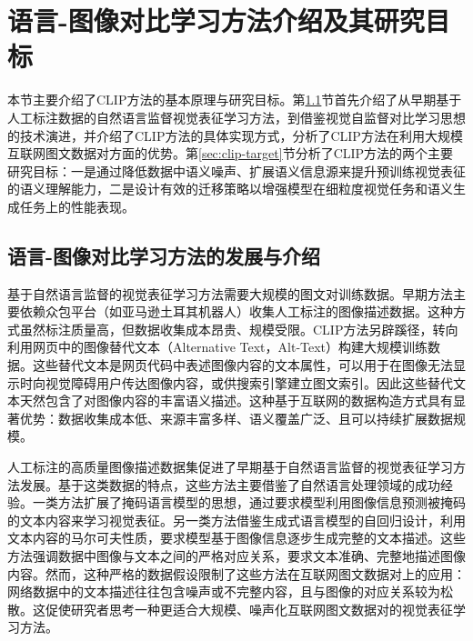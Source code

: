 \section{语言-图像对比学习方法介绍及其研究目标}
本节主要介绍了CLIP方法的基本原理与研究目标。第\ref{sec:clip-introduce}节首先介绍了从早期基于人工标注数据的自然语言监督视觉表征学习方法，到借鉴视觉自监督对比学习思想的技术演进，并介绍了CLIP方法的具体实现方式，分析了CLIP方法在利用大规模互联网图文数据对方面的优势。第\ref{sec:clip-target}节分析了CLIP方法的两个主要研究目标：一是通过降低数据中语义噪声、扩展语义信息源来提升预训练视觉表征的语义理解能力，二是设计有效的迁移策略以增强模型在细粒度视觉任务和语义生成任务上的性能表现。

\subsection{语言-图像对比学习方法的发展与介绍}
\label{sec:clip-introduce}
基于自然语言监督的视觉表征学习方法需要大规模的图文对训练数据。早期方法主要依赖众包平台（如亚马逊土耳其机器人\cite{AMT}）收集人工标注的图像描述数据\cite{young2014flickr, chen2015microsoft}。这种方式虽然标注质量高，但数据收集成本昂贵、规模受限。CLIP方法另辟蹊径，转向利用网页中的图像替代文本（Alternative Text，Alt-Text）构建大规模训练数据\cite{YFCC100M, sharma-etal-2018-conceptual, changpinyo2021conceptual}。这些替代文本是网页代码中表述图像内容的文本属性，可以用于在图像无法显示时向视觉障碍用户传达图像内容，或供搜索引擎建立图文索引。因此这些替代文本天然包含了对图像内容的丰富语义描述。这种基于互联网的数据构造方式具有显著优势：数据收集成本低、来源丰富多样、语义覆盖广泛、且可以持续扩展数据规模。

人工标注的高质量图像描述数据集\cite{young2014flickr, chen2015microsoft}促进了早期基于自然语言监督的视觉表征学习方法发展。基于这类数据的特点，这些方法主要借鉴了自然语言处理领域的成功经验。一类方法扩展了掩码语言模型\cite{BERT}的思想，通过要求模型利用图像信息预测被掩码的文本内容来学习视觉表征\cite{sariyildiz2020learning}。另一类方法借鉴生成式语言模型\cite{gpt2}的自回归设计，利用文本内容的马尔可夫性质，要求模型基于图像信息逐步生成完整的文本描述\cite{desai2021virtex}。这些方法强调数据中图像与文本之间的严格对应关系，要求文本准确、完整地描述图像内容。然而，这种严格的数据假设限制了这些方法在互联网图文数据对上的应用：网络数据中的文本描述往往包含噪声或不完整内容，且与图像的对应关系较为松散。这促使研究者思考一种更适合大规模、噪声化互联网图文数据对的视觉表征学习方法。

